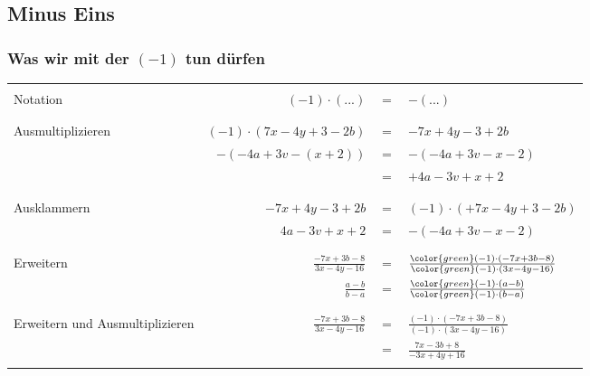 
\newpage
\subsection{Minus Eins}

\subsubsection*{Was wir mit der $(-1)$ tun dürfen}

\begin{tabular}{p{5cm}|rcl}
  \hline\\
  Notation          & $(-1)\cdot(...)$                &$=$& $-(...)$                      \\
  \\
  \hline\\
  Ausmultiplizieren & $(-1)\cdot(7x-4y+3-2b)$              &$=$& $-7x + 4y -3 + 2b$            \\
                    & $-(-4a + 3v -(x+2))$            &$=$& $-(-4a +3v -x-2)$             \\
                    &                                 &$=$& $+4a -3v +x+2$                \\
  \\
  \hline\\
  Ausklammern       & $-7x +4y -3 +2b$                &$=$& $(-1)\cdot (+7x -4y + 3 -2b)$ \\
                    & $4a -3v + x +2$                 &$=$& $-(-4a + 3v -x -2)$           \\
  \\
  \hline\\
  Erweitern         & $\frac{-7x+3b -8}{3x - 4y -16}$ &$=$& $\frac{{\color{green}(-1)}\cdot(-7x+3b -8)}{{\color{green}(-1)}\cdot(3x - 4y -16)}$\\
                    & $\frac{a-b}{b-a}$               &$=$& $\frac{{\color{green}(-1)}\cdot(a-b)}{{\color{green}(-1)}\cdot(b-a)}$\\
  \\
  \hline\\                      
  Erweitern und Ausmultiplizieren  & $\frac{-7x+3b -8}{3x - 4y -16}$ &$=$& $\frac{(-1)\cdot(-7x+3b -8)}{(-1)\cdot(3x - 4y -16)}$\\
                    &                                 &$=$& $\frac{7x-3b+8}{-3x+4y+16}$\\
  \\

\end{tabular}
